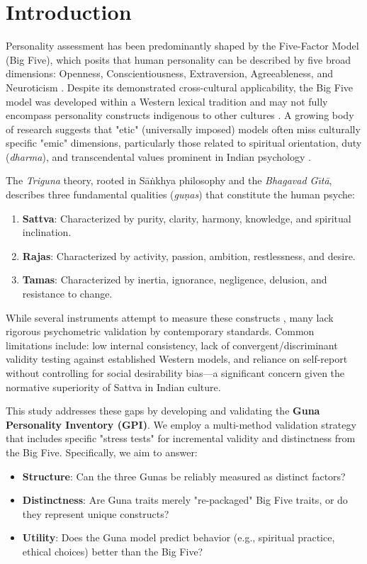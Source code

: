 \documentclass[runningheads]{llncs}
\begin{document}
\section{Introduction}

Personality assessment has been predominantly shaped by the Five-Factor Model (Big Five), which posits that human personality can be described by five broad dimensions: Openness, Conscientiousness, Extraversion, Agreeableness, and Neuroticism \cite{john1999}. Despite its demonstrated cross-cultural applicability, the Big Five model was developed within a Western lexical tradition and may not fully encompass personality constructs indigenous to other cultures \cite{misra1993}. A growing body of research suggests that "etic" (universally imposed) models often miss culturally specific "emic" dimensions, particularly those related to spiritual orientation, duty (\textit{dharma}), and transcendental values prominent in Indian psychology \cite{wolf1999}.

The \textit{Triguna} theory, rooted in S\={a}\.{n}khya philosophy and the \textit{Bhagavad G\={\i}t\={a}}, describes three fundamental qualities (\textit{gu\d{n}as}) that constitute the human psyche:
\begin{enumerate}
    \item \textbf{Sattva}: Characterized by purity, clarity, harmony, knowledge, and spiritual inclination.
    \item \textbf{Rajas}: Characterized by activity, passion, ambition, restlessness, and desire.
    \item \textbf{Tamas}: Characterized by inertia, ignorance, negligence, delusion, and resistance to change.
\end{enumerate}

While several instruments attempt to measure these constructs \cite{das1987}, many lack rigorous psychometric validation by contemporary standards. Common limitations include: low internal consistency, lack of convergent/discriminant validity testing against established Western models, and reliance on self-report without controlling for social desirability bias---a significant concern given the normative superiority of Sattva in Indian culture.

This study addresses these gaps by developing and validating the \textbf{Guna Personality Inventory (GPI)}. We employ a multi-method validation strategy that includes specific "stress tests" for incremental validity and distinctness from the Big Five. Specifically, we aim to answer:
\begin{itemize}
    \item \textbf{Structure}: Can the three Gunas be reliably measured as distinct factors?
    \item \textbf{Distinctness}: Are Guna traits merely "re-packaged" Big Five traits, or do they represent unique constructs?
    \item \textbf{Utility}: Does the Guna model predict behavior (e.g., spiritual practice, ethical choices) better than the Big Five?
\end{itemize}
\end{document}
